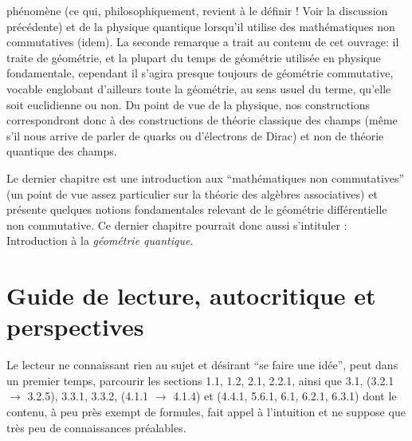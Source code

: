 ph\'enom\`ene (ce qui, philosophiquement, revient \`a le d\'efinir !
Voir la discussion pr\'ec\'edente)  et de la physique quantique
lorsqu'il utilise des math\'ematiques non commutatives (idem).
 La seconde remarque a trait au contenu de cet ouvrage: il
traite de g\'eom\'etrie, et la plupart du temps de g\'eom\'etrie
utilis\'ee en physique fondamentale, cependant il s'agira presque
toujours de g\'eom\'etrie commutative, vocable englobant d'ailleurs
toute la g\'eom\'etrie, au sens usuel du terme, qu'elle soit
euclidienne ou non. Du point de vue de la physique, nos
constructions correspondront donc \`a des constructions de th\'eorie
classique des champs (m\^eme s'il nous arrive de parler de quarks ou
d'\'electrons de Dirac) et non de th\'eorie quantique des champs.
\par
Le dernier chapitre est une introduction aux ``math\'ematiques non 
commutatives'' (un point de vue assez particulier sur la th\'eorie 
des alg\`ebres associatives) et pr\'esente  
quelques notions fondamentales relevant de le g\'eom\'etrie 
diff\'erentielle non commutative. Ce dernier chapitre pourrait donc 
aussi s'intituler : Introduction \`a la {\sl g\'eom\'etrie quantique\/}.
\vfill
\eject

\section*{Guide de lecture, autocritique et perspectives}

Le lecteur ne connaissant rien au sujet et d\'esirant ``se faire une id\'ee'',
peut dans un premier temps,
parcourir les sections 1.1, 1.2, 2.1, 2.2.1, ainsi que
3.1, (3.2.1 $\rightarrow$ 
3.2.5), 3.3.1, 3.3.2,  (4.1.1 $\rightarrow$ 4.1.4)  et (4.4.1, 5.6.1, 6.1, 6.2.1, 
6.3.1) dont le contenu, 
\`a peu pr\`es exempt de 
formules, fait appel \`a 
l'intuition et ne suppose que tr\`es peu de connaissances 
pr\'ealables.

